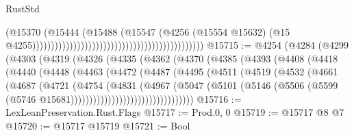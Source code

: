 \begin{lexlean}{RustStd}
\begin{coremodule}
                                                                                    (@15370
                                                                                      (@15444
                                                                                        (@15488
                                                                                          (@15547
                                                                                            (@4256
                                                                                              (@15554
                                                                                                @15632)
                                                                                              (@15
                                                                                                @4255))))))))))))))))))))))))))))))))))))))))))))))
@15715 := @4254
    (@4284
      (@4299
        (@4303
          (@4319
            (@4326
              (@4335
                (@4362
                  (@4370
                    (@4385
                      (@4393
                        (@4408
                          (@4418
                            (@4440
                              (@4448
                                (@4463
                                  (@4472
                                    (@4487
                                      (@4495
                                        (@4511
                                          (@4519
                                            (@4532
                                              (@4661
                                                (@4687
                                                  (@4721
                                                    (@4754
                                                      (@4831
                                                        (@4967
                                                          (@5047
                                                            (@5101
                                                              (@5146
                                                                (@5506
                                                                  (@5599
                                                                    (@5746
                                                                      @15681)))))))))))))))))))))))))))))))))
@15716 := LexLeanPreservation.Rust.Flags
@15717 := Prod.{0, 0}
@15719 := @15717 @8 @7
@15720 := @15717 @15719
@15721 := Bool

\end{coremodule}
\end{lexlean}
